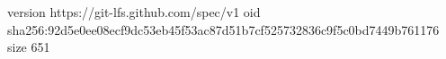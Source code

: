 version https://git-lfs.github.com/spec/v1
oid sha256:92d5e0ee08ecf9dc53eb45f53ac87d51b7cf525732836c9f5c0bd7449b761176
size 651
